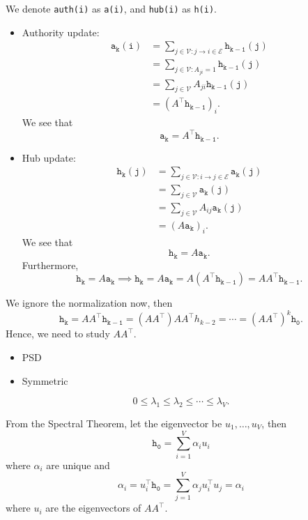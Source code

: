 \begin{notation}
	We denote \texttt{auth(i)} as \texttt{a(i)}, and \texttt{hub(i)} as \texttt{h(i)}.
\end{notation}

\begin{itemize}
	\item Authority update:\[
		      \begin{split}
			      \mathtt{a_k(i)} & = \sum\limits_{j\in \mathcal{V}: j\to i\in \mathcal{E}}\mathtt{h_{k-1}(j)}\\
			      &=\sum\limits_{j\in\mathcal{V}\colon A_{ji} = 1}\mathtt{h_{k-1}(j)}\\
			      &=\sum\limits_{j\in\mathcal{V}}A_{ji}\mathtt{h_{k-1}(j)}\\
			      &= \left(A^{\top} \mathtt{h_{k-1}}\right)_i.
		      \end{split}
	      \]
	      We see that
	      \[
		      \mathtt{a_k} = A^{\top}\mathtt{h_{k-1}}.
	      \]
	\item Hub update:\[
		      \begin{split}
			      \mathtt{h_k(j)} &= \sum\limits_{j\in\mathcal{V}: i\to j\in\mathcal{E}} \mathtt{a_k(j)}\\
			      &= \sum\limits_{j\in\mathcal{V}} \mathtt{a_k(j)}\\
			      &= \sum\limits_{j\in\mathcal{V} }A_{ij}\mathtt{a_k(j)}\\
			      &= \left(A\mathtt{a_k}\right)_i.
		      \end{split}
	      \]
	      We see that
	      \[
		      \mathtt{h_{k}} = A \mathtt{a_{k}}.
	      \]
	      Furthermore,
	      \[
		      \mathtt{h_k} = A\mathtt{a_k}\implies \mathtt{h_k}= A\mathtt{a_k} = A(A^{\top}\mathtt{h_{k-1}}) = A A^{\top} \mathtt{h_{k-1}}.
	      \]
\end{itemize}
We ignore the normalization now, then
\[
	\mathtt{h_k} = A A^{\top}\mathtt{h_{k-1}} = (A A^{\top})A A^{\top} h_{k-2} = \cdots = (A A^{\top})^k \mathtt{h_0}.
\]
Hence, we need to study \(A A^{\top}\).
\begin{itemize}
	\item PSD
	\item Symmetric
\end{itemize}
\[
	0 \leq \lambda_1 \leq \lambda_2 \leq \cdots \leq \lambda_V.
\]

From the Spectral Theorem, let the eigenvector be \(u_1, \ldots , u_V\), then
\[
	\mathtt{h_0} = \sum\limits_{i=1}^{V} \alpha_i u_{i}
\]
where \(\alpha_{i}\) are unique and
\[
	\alpha_{i} = u_{i}^{\top}\mathtt{h_0} = \sum\limits_{j=1}^{V} \alpha_{j}u_{i}^{\top}u_{j} = \alpha_{i}
\]
where \(u_{i}\) are the eigenvectors of \(A A^{\top}\).

